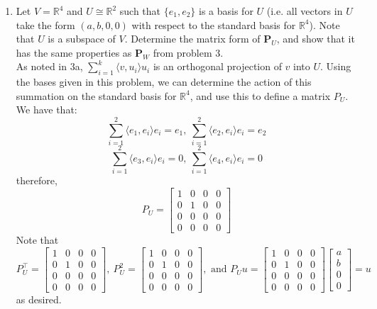 \documentclass{article}
\begin{document}
\begin{enumerate}[label=\arabic*.]
\begin{enumerate}[label=(\alph*)]
\begin{enumerate}[label=\roman*.]
	\end{enumerate}
	\end{enumerate}
	\item Let $V = \mathbb{R}^4$ and $U \cong \mathbb{R}^2$ such that $\{e_1, e_2\}$ is a basis for $U$ (i.e. all vectors in $U$ take the form $(a, b, 0, 0)$ with respect to the standard basis for $\mathbb{R}^4$). Note that $U$ is a subspace of $V$. Determine the matrix form of $\mathbf{P}_{U}$, and show that it has the same properties as $\mathbf{P}_W$ from problem 3. \\
	{\color{blue} As noted in 3a, $\sum\limits_{i=1}^k\langle v, u_i\rangle u_i$ is an orthogonal projection of $v$ into $U$. Using the bases given in this problem, we can determine the action of this summation on the standard basis for $\mathbb{R}^4$, and use this to define a matrix $P_U$. We have that:
	$$\sum\limits_{i = 1}^2\langle e_1, e_i\rangle e_i = e_1,\ 
	\sum\limits_{i = 1}^2\langle e_2, e_i\rangle e_i = e_2$$
	$$\sum\limits_{i = 1}^2\langle e_3, e_i\rangle e_i = 0, \ 
	\sum\limits_{i = 1}^2\langle e_4, e_i\rangle e_i = 0$$
	therefore, $$P_U = \begin{bmatrix} 1 & 0 & 0 & 0 \\ 0 & 1 & 0 & 0 \\ 0 & 0 & 0 & 0 \\ 0 & 0 & 0 & 0 \end{bmatrix}$$ Note that $$P_U^{\top} = \begin{bmatrix} 1 & 0 & 0 & 0 \\ 0 & 1 & 0 & 0 \\ 0 & 0 & 0 & 0 \\ 0 & 0 & 0 & 0 \end{bmatrix},\ P_U^2 = \begin{bmatrix} 1 & 0 & 0 & 0 \\ 0 & 1 & 0 & 0 \\ 0 & 0 & 0 & 0 \\ 0 & 0 & 0 & 0 \end{bmatrix},\text{ and } P_Uu = \begin{bmatrix} 1 & 0 & 0 & 0 \\ 0 & 1 & 0 & 0 \\ 0 & 0 & 0 & 0 \\ 0 & 0 & 0 & 0 \end{bmatrix}\begin{bmatrix} a \\ b \\ 0 \\ 0\end{bmatrix} = u$$ as desired.}
\end{enumerate}
\end{document}
